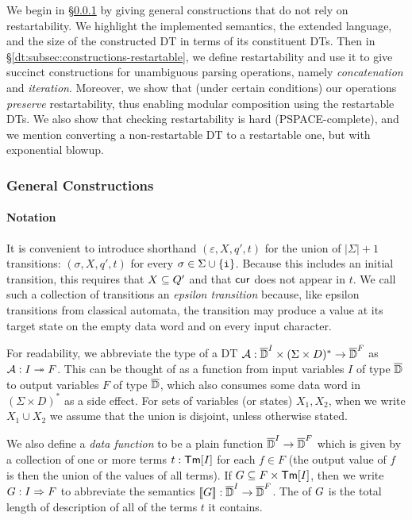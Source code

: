 We begin in \S\ref{dt:subsec:constructions-general} by giving general constructions that do not rely on restartability. We highlight the implemented semantics, the extended language, and the size of the constructed DT in terms of its constituent DTs.
Then in \S\ref{dt:subsec:constructions-restartable}, we define restartability and use it to give succinct constructions for unambiguous parsing operations, namely \emph{concatenation} and \emph{iteration}.
Moreover, we show that (under certain conditions) our operations \emph{preserve} restartability, thus enabling modular composition using the restartable DTs. We also show that checking restartability is hard (PSPACE-complete), and we mention converting a non-restartable DT to a restartable one, but with exponential blowup.

\subsubsection{General Constructions}
\label{dt:subsec:constructions-general}

\paragraph*{Notation}
It is convenient to introduce shorthand $(\varepsilon, X, q', t)$ for the union of $|\Sigma| + 1$ transitions: $(\sigma, X, q', t)$ for every $\sigma \in \Sigma \cup \{{\texttt{i}}\}$. Because this includes an initial transition, this requires that $X \subseteq Q'$ and that $\mathsf{cur}$ does not appear in $t$. We call such a collection of transitions an \emph{epsilon transition} because, like epsilon transitions from classical automata, the transition may produce a value at its target state on the empty data word and on every input character.

For readability, we abbreviate the type of a DT
$\mathcal{A}: \overline{\mathbb{D}{}}^I \times (\Sigma \times D)^* \to \overline{\mathbb{D}{}}^F$ as $\mathcal{A}: I \twoheadrightarrow F$.
This can be thought of as a function from input variables $I$ of type $\overline{\mathbb{D}{}}$ to output variables $F$ of type $\overline{\mathbb{D}{}}$, which also consumes some data word in $(\Sigma \times D)^*$ as a side effect.
For sets of variables (or states) $X_1, X_2$, when we write $X_1 \cup X_2$ we assume that the union is disjoint, unless otherwise stated.

We also define a \emph{data function} to be a plain function $\overline{\mathbb{D}{}}^I \to \overline{\mathbb{D}{}}^F$ which is
given by a collection of one or more terms $t : \textsf{Tm}[I]$ for each $f \in F$ (the output value of $f$ is then the union of the values of all terms). If $G \subseteq F \times \textsf{Tm}[I]$, then we write $G: I \Rightarrow F$ to abbreviate the semantics $\llbracket G \rrbracket: \overline{\mathbb{D}{}}^I \to \overline{\mathbb{D}{}}^F$.
The  of $G$ is the total length of description of all of the terms $t$ it contains.

